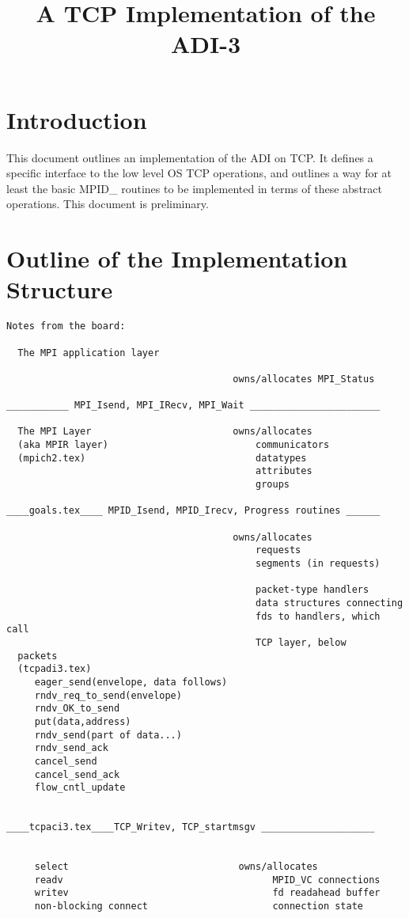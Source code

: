 \documentclass{article}
\begin{document}
\title{A TCP Implementation of the ADI-3}
\author{}
\maketitle

\begin{abstract}

\end{abstract}

\section{Introduction}
This document outlines an implementation of the ADI on TCP.  It defines a
specific interface to the low level OS TCP operations, and outlines a way
for at least the basic MPID_ routines to be implemented in terms of these
abstract operations.  This document is preliminary.

\section{Outline of the Implementation Structure}

\begin{verbatim}
Notes from the board:

  The MPI application layer

                                        owns/allocates MPI_Status

___________ MPI_Isend, MPI_IRecv, MPI_Wait _______________________

  The MPI Layer                         owns/allocates
  (aka MPIR layer)                          communicators
  (mpich2.tex)                              datatypes
                                            attributes
                                            groups

____goals.tex____ MPID_Isend, MPID_Irecv, Progress routines ______

                                        owns/allocates
                                            requests
                                            segments (in requests)

                                            packet-type handlers
                                            data structures connecting
                                            fds to handlers, which call
                                            TCP layer, below 
  packets
  (tcpadi3.tex)
     eager_send(envelope, data follows)
     rndv_req_to_send(envelope)
     rndv_OK_to_send
     put(data,address)
     rndv_send(part of data...)
     rndv_send_ack
     cancel_send
     cancel_send_ack
     flow_cntl_update


____tcpaci3.tex____TCP_Writev, TCP_startmsgv ____________________


     select                              owns/allocates
     readv                                     MPID_VC connections
     writev                                    fd readahead buffer
     non-blocking connect                      connection state

\end{verbatim}
\end{document}
